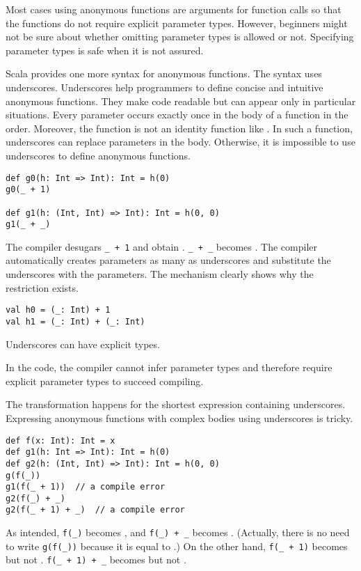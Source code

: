 Most cases using anonymous functions are arguments for function calls so that the
functions do not require explicit parameter types. However, beginners might not
be sure about whether omitting parameter types is allowed or not. Specifying
parameter types is safe when it is not assured.

Scala provides one more syntax for anonymous functions. The syntax uses
underscores. Underscores help programmers to define concise and intuitive
anonymous functions. They make code readable but can appear only in particular
situations. Every parameter occurs exactly once in the body of a function in the
order. Moreover, the function is not an identity function like .
In such a function, underscores can replace parameters in the body.
Otherwise, it is impossible to use underscores to define anonymous functions.

\begin{verbatim}
def g0(h: Int => Int): Int = h(0)
g0(_ + 1)

def g1(h: (Int, Int) => Int): Int = h(0, 0)
g1(_ + _)
\end{verbatim}

The compiler desugars \verb!_ + 1! and obtain .
\verb!_ + _!
becomes . The compiler automatically creates parameters
as many as underscores and substitute the underscores with the parameters. The
mechanism clearly shows why the restriction exists.

\begin{verbatim}
val h0 = (_: Int) + 1
val h1 = (_: Int) + (_: Int)
\end{verbatim}

Underscores can have explicit types.

In the code, the compiler cannot infer parameter types and therefore require
explicit parameter types to succeed compiling.

The transformation happens for the shortest expression containing underscores.
Expressing anonymous functions with complex bodies using underscores is tricky.

\begin{verbatim}
def f(x: Int): Int = x
def g1(h: Int => Int): Int = h(0)
def g2(h: (Int, Int) => Int): Int = h(0, 0)
g(f(_))
g1(f(_ + 1))  // a compile error
g2(f(_) + _)
g2(f(_ + 1) + _)  // a compile error
\end{verbatim}

As intended, \verb!f(_)! becomes , and \verb!f(_) + _! becomes
. (Actually, there is no need to write \verb!g(f(_))!
because it is equal to .) On the other hand, \verb!f(_ + 1)! becomes
 but not . \verb!f(_ + 1) + _! becomes
 but not .

